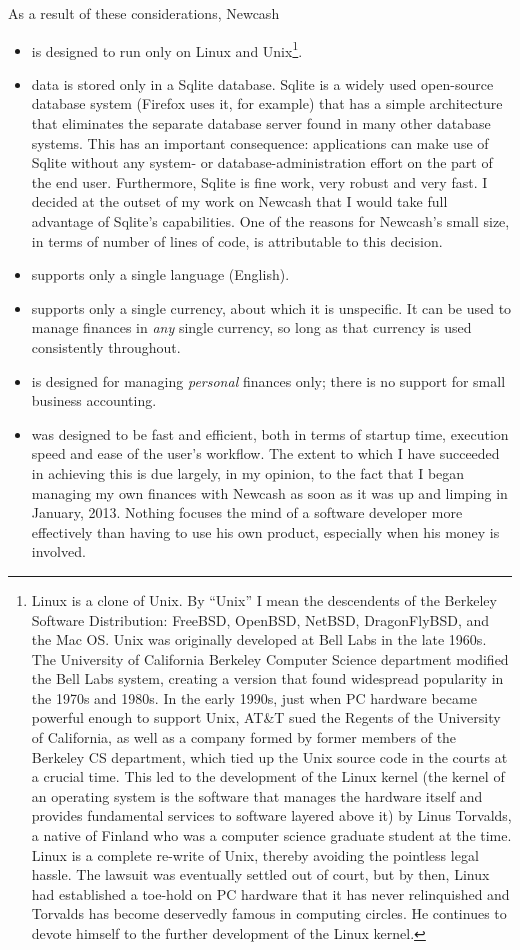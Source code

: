 \documentclass{report}
\begin{document}
As a result of these considerations, Newcash
\begin{itemize}
\item is designed to run only on Linux and Unix\footnote{Linux is a clone of Unix. By ``Unix'' I mean the descendents of the Berkeley Software Distribution: FreeBSD, OpenBSD, NetBSD, DragonFlyBSD, and the Mac OS. Unix was originally developed at Bell Labs in the late 1960s. The University of California Berkeley Computer Science department modified the Bell Labs system, creating a version that found widespread popularity in the 1970s and 1980s. In the early 1990s, just when PC hardware became powerful enough to support Unix, AT\&T sued the Regents of the University of California, as well as a company formed by former members of the Berkeley CS department, which tied up the Unix source code  in the courts at a crucial time. This led to the development of the Linux kernel (the kernel of an operating system is the software that manages the hardware itself and provides fundamental services to software layered above it) by Linus Torvalds, a native of Finland who was a computer science graduate student at the time. Linux is a complete re-write of Unix, thereby avoiding the pointless legal hassle. The lawsuit was eventually settled out of court, but by then, Linux had established a toe-hold on PC hardware that it has never relinquished and Torvalds has become deservedly famous in computing circles. He continues to devote himself to the further development of the Linux kernel.}. 
\item data is stored only in a Sqlite database. Sqlite is a widely used open-source database system (Firefox uses it, for example) that has a simple architecture that eliminates the separate database server found in many other database systems. This has an important consequence: applications can make use of Sqlite without any system- or database-administration effort on the part of the end user. Furthermore, Sqlite is fine work, very robust and very fast. I decided at the outset of my work on Newcash that I would take full advantage of Sqlite's capabilities. One of the reasons for Newcash's small size, in terms of number of lines of code, is attributable to this decision.
\item supports only a single language (English).
\item supports only a single currency, about which it is unspecific. It can be used to manage finances in \emph{any} single currency, so long as that currency is used consistently throughout.
\item is designed for managing \emph{personal} finances only; there is no support for small business accounting. 
\item was designed to be fast and efficient, both in terms of startup time, execution speed and ease of the user's workflow. The extent to which I have succeeded in achieving this is due largely, in my opinion, to the fact that  I began managing my own finances  with Newcash as soon as it was up and limping in January, 2013. Nothing focuses the mind of a software developer more effectively than having to use his own product, especially when his money is involved.


\end{itemize}
\end{document}
